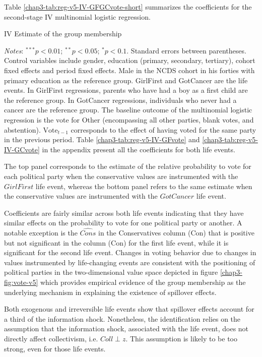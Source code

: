 Table \ref{chap3-tab:reg-v5-IV-GFGCvote-short} summarizes the coefficients for the second-stage IV multinomial logistic regression.
\begin{table}[!tb]
    \centering
    \caption{IV Estimate of the group membership}
    \label{chap3-tab:reg-v5-IV-GFGCvote-short}
    \begin{threeparttable}
        
        \begin{tablenotes}[flushleft]
            \footnotesize{\item \textit{Notes}: $^{***}p<0.01$; $^{**}p<0.05$; $^{*}p<0.1$. Standard errors between parentheses. Control variables include gender, education (primary, secondary, tertiary), cohort fixed effects and period fixed effects. Male in the NCDS cohort in his forties with primary education as the reference group. GirlFirst and GotCancer are the life events. In GirlFirst regressions, parents who have had a boy as a first child are the reference group. In GotCancer regressions, individuals who never had a cancer are the reference group. 
            The baseline outcome of the multinomial logistic regression is the vote for Other (encompassing all other parties, blank votes, and abstention). $\text{Vote}_{t-1}$ corresponds to the effect of having voted for the same party in the previous period.
            Table \ref{chap3-tab:reg-v5-IV-GFvote} and \ref{chap3-tab:reg-v5-IV-GCvote} in the appendix present all the coefficients for both life events.}
        \end{tablenotes}
    \end{threeparttable}
\end{table}
The top panel corresponds to the estimate of the relative probability to vote for each political party when the conservative values are instrumented with the $GirlFirst$ life event, whereas the bottom panel refers to the same estimate when the conservative values are instrumented with the $GotCancer$ life event.

Coefficients are fairly similar across both life events indicating that they have similar effects on the probability to vote for one political party or another. A notable exception is the $\widehat{Cons}$ in the Conservatives column (Con) that is positive but not significant in the column (Con) for the first life event, while it is significant for the second life event. Changes in voting behavior due to changes in values instrumented by life-changing events are consistent with the positioning of political parties in the two-dimensional value space depicted in figure \ref{chap3-fig:vote-v5} which provides empirical evidence of the group membership as the underlying mechanism in explaining the existence of spillover effects.

Both exogenous and irreversible life events show that spillover effects account for a third of the information shock. Nonetheless, the identification relies on the assumption that the information shock, associated with the life event, does not directly affect collectivism, i.e. $Coll \perp z$. This assumption is likely to be too strong, even for those life events.
